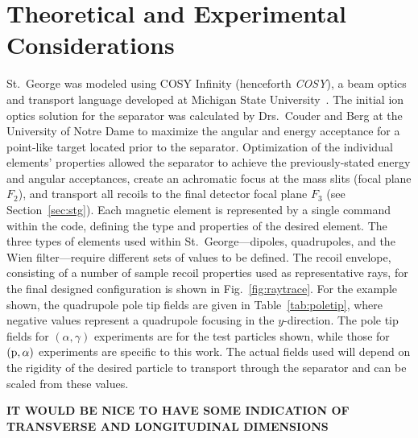 \section{Theoretical and Experimental Considerations}
\label{sec:cosy}


St.\ George was modeled using COSY Infinity (henceforth \emph{COSY}), a
beam optics and transport language developed at Michigan State
University~\cite{COSY}. The initial ion optics solution for the
separator was calculated by Drs.\ Couder and Berg at the University of
Notre Dame to maximize the angular and energy acceptance for a
point-like target located prior to the separator. Optimization of the
individual elements' properties allowed the separator to achieve the
previously-stated energy and angular acceptances, create an achromatic
focus at the mass slits (focal plane $F_2$), and transport all recoils
to the final detector focal plane $F_3$ (see Section~\ref{sec:stg}).
Each magnetic element is represented by a single command within the
code, defining the type and properties of the desired element. The three
types of elements used within St.\ George\----{}dipoles, quadrupoles,
and the Wien filter\----{}require different sets of values to be
defined. The recoil envelope, consisting of a number of sample recoil
properties used as representative rays, for the final designed
configuration is shown in Fig.~\ref{fig:raytrace}. For the example
shown, the quadrupole pole tip fields are given in
Table~\ref{tab:poletip}, where negative values represent a quadrupole
focusing in the $y$-direction. The pole tip fields for $(\alpha,\gamma)$
experiments are for the test particles shown, while those for $({\rm
p},\alpha)$ experiments are specific to this work. The actual fields
used will depend on the rigidity of the desired particle to transport
through the separator and can be scaled from these values.

\textbf{IT WOULD BE NICE TO HAVE SOME INDICATION OF TRANSVERSE AND
LONGITUDINAL DIMENSIONS}

